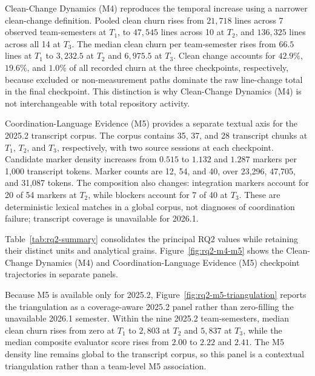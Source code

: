 Clean-Change Dynamics (M4) reproduces the temporal increase using a narrower
clean-change definition.
Pooled clean churn rises from $21{,}718$ lines across 7 observed team-semesters
at $T_1$, to $47{,}545$ lines across 10 at $T_2$, and $136{,}325$ lines across
all 14 at $T_3$. The median clean churn per team-semester rises from $66.5$
lines at $T_1$ to $3{,}232.5$ at $T_2$ and $6{,}975.5$ at $T_3$. Clean change
accounts for $42.9\%$, $19.6\%$, and $1.0\%$ of all recorded churn at the
three checkpoints, respectively, because excluded or non-measurement paths
dominate the raw line-change total in the final checkpoint. This distinction is
why Clean-Change Dynamics (M4) is not interchangeable with total repository
activity.

Coordination-Language Evidence (M5) provides a separate textual axis for the
2025.2 transcript corpus. The
corpus contains 35, 37, and 28 transcript chunks at $T_1$, $T_2$, and $T_3$,
respectively, with two source sessions at each checkpoint. Candidate marker
density increases from $0.515$ to $1.132$ and $1.287$ markers per 1,000
transcript tokens. Marker counts are 12, 54, and 40, over 23,296, 47,705,
and 31,087 tokens. The composition also changes: integration markers account
for 20 of 54 markers at $T_2$, while blockers account for 7 of 40 at $T_3$.
These are deterministic lexical matches in a global corpus, not diagnoses of
coordination failure; transcript coverage is unavailable for 2026.1.

Table~\ref{tab:rq2-summary} consolidates the principal RQ2 values while
retaining their distinct units and analytical grains. Figure~\ref{fig:rq2-m4-m5}
shows the Clean-Change Dynamics (M4) and Coordination-Language Evidence (M5)
checkpoint trajectories in separate panels.

Because M5 is available only for 2025.2, Figure~\ref{fig:rq2-m5-triangulation}
reports the triangulation as a coverage-aware 2025.2 panel rather than
zero-filling the unavailable 2026.1 semester. Within the nine 2025.2
team-semesters, median clean churn rises from zero at $T_1$ to $2{,}803$ at
$T_2$ and $5{,}837$ at $T_3$, while the median composite evaluator score rises
from $2.00$ to $2.22$ and $2.41$. The M5 density line remains global to the
transcript corpus, so this panel is a contextual triangulation rather than a
team-level M5 association.

